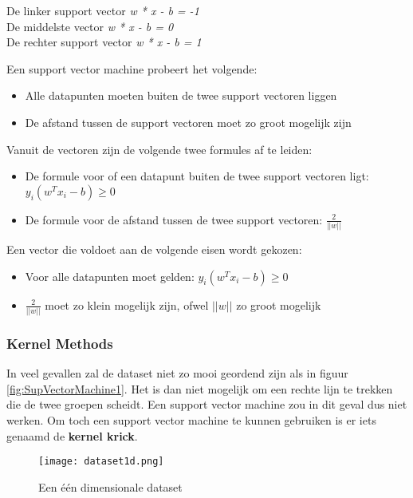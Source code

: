 \begin{center}
De linker support vector	\textit{w * x - b = -1}
\\De middelste vector			\textit{w * x - b = 0}
\\De rechter support vector 	\textit{w * x - b = 1}
\end{center}

Een support vector machine probeert het volgende:

\begin{itemize}
\item Alle datapunten moeten buiten de twee support vectoren liggen
\item De afstand tussen de support vectoren moet zo groot mogelijk zijn
\end{itemize}

Vanuit de vectoren zijn de volgende twee formules af te leiden:
\begin{itemize}
\item De formule voor of een datapunt buiten de twee support vectoren ligt: $y_{i}(w^{T}x_{i} - b) \geq 0 $
\item De formule voor de afstand tussen de twee support vectoren: $\frac{2}{||w||}$
\end{itemize} 

Een vector die voldoet aan de volgende eisen wordt gekozen:
\begin{itemize}
\item Voor alle datapunten moet gelden: $y_{i}(w^{T}x_{i} - b) \geq 0 $
\item $\frac{2}{||w||}$ moet zo klein mogelijk zijn, ofwel $||w||$ zo groot mogelijk
\end{itemize}



\subsubsection{Kernel Methods}
In veel gevallen zal de dataset niet zo mooi geordend zijn als in figuur \ref{fig:SupVectorMachine1}. Het is dan niet mogelijk om een rechte lijn te trekken die de twee groepen scheidt. Een support vector machine zou in dit geval dus niet werken. Om toch een support vector machine te kunnen gebruiken is er iets genaamd de \textbf{kernel krick}.

\begin{figure}[h]
  \centering
    \texttt{[image: dataset1d.png]}
  \caption{Een één dimensionale dataset}
  \label{fig:SupVectorMachine2}
\end{figure}

